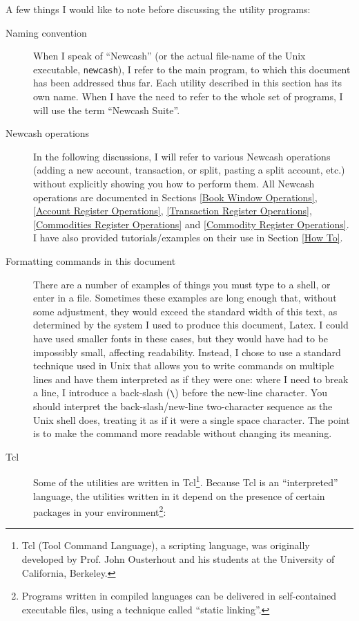 \documentclass{report}
\begin{document}
A few things I would like to note before discussing the utility programs:
\begin{description}
\item [Naming convention] When I speak of ``Newcash'' (or the actual file-name of the Unix executable, \verb|newcash|), I refer to the main program, to which this document has been addressed thus far. Each utility described in this section has its own name. When I have the need to refer to the whole set of programs, I will use the term ``Newcash Suite''.
\item [Newcash operations] In the following discussions, I will refer to various Newcash operations (adding a new account, transaction, or split, pasting a split account, etc.) without explicitly showing you how to perform them. All Newcash operations are documented in Sections \ref{Book Window Operations}, \ref{Account Register Operations}, \ref{Transaction Register Operations}, \ref{Commodities Register Operations} and \ref{Commodity Register Operations}.  I have also provided tutorials/examples on their use in Section \ref{How To}.
\item [Formatting commands in this document] There are a number of examples of things you must type to a shell, or enter in a file. Sometimes these examples are long enough that, without some adjustment, they would exceed the standard width of this text, as determined by the system I used to produce this document, Latex. I could have used smaller fonts in these cases, but they would have had to be impossibly small, affecting readability. Instead, I chose to use a standard technique used in Unix that allows you to write commands on multiple lines and have them interpreted as if they were one: where I need to break a line, I introduce a back-slash (\verb|\|) before the new-line character. You should interpret the back-slash/new-line two-character sequence as the Unix shell does, treating it as if it were a single space character. The point is to make the command more readable without changing its meaning.
\item [Tcl] Some of the utilities are written in Tcl\footnote{Tcl (Tool Command Language), a scripting language, was originally developed  by Prof. John Ousterhout and his students at the University of California, Berkeley.}. Because Tcl is an ``interpreted'' language, the utilities written in it depend on the presence of certain packages in your environment\footnote{Programs written in compiled languages can be delivered in self-contained executable files, using a technique called ``static linking''.}:

\end{description}
\end{document}
